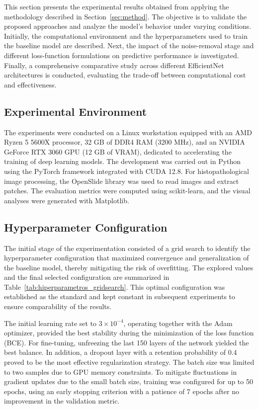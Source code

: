 This section presents the experimental results obtained from applying the methodology described in Section~\ref{sec:method}. The objective is to validate the proposed approaches and analyze the model's behavior under varying conditions. Initially, the computational environment and the hyperparameters used to train the baseline model are described. Next, the impact of the noise-removal stage and different loss-function formulations on predictive performance is investigated. Finally, a comprehensive comparative study across different EfficientNet architectures is conducted, evaluating the trade-off between computational cost and effectiveness.

\subsection{Experimental Environment}

The experiments were conducted on a Linux workstation equipped with an AMD Ryzen 5 5600X processor, 32 GB of DDR4 RAM (3200 MHz), and an NVIDIA GeForce RTX 3060 GPU (12 GB of VRAM), dedicated to accelerating the training of deep learning models. The development was carried out in Python using the PyTorch framework integrated with CUDA 12.8. For histopathological image processing, the OpenSlide library was used to read images and extract patches. The evaluation metrics were computed using scikit-learn, and the visual analyses were generated with Matplotlib.

\subsection{Hyperparameter Configuration}

The initial stage of the experimentation consisted of a grid search to identify the hyperparameter configuration that maximized convergence and generalization of the baseline model, thereby mitigating the risk of overfitting. The explored values and the final selected configuration are summarized in Table~\ref{tab:hiperparametros_gridsearch}. This optimal configuration was established as the standard and kept constant in subsequent experiments to ensure comparability of the results.

The initial learning rate set to $3\times10^{-4}$, operating together with the Adam optimizer, provided the best stability during the minimization of the loss function (BCE). For fine-tuning, unfreezing the last 150 layers of the network yielded the best balance. In addition, a dropout layer with a retention probability of 0.4 proved to be the most effective regularization strategy. The batch size was limited to two samples due to GPU memory constraints. To mitigate fluctuations in gradient updates due to the small batch size, training was configured for up to 50 epochs, using an early stopping criterion with a patience of 7 epochs after no improvement in the validation metric.


